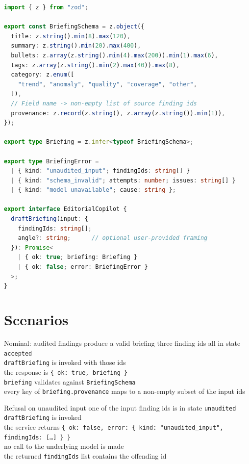 \begin{lstlisting}[language=TypeScript]
import { z } from "zod";

export const BriefingSchema = z.object({
  title: z.string().min(8).max(120),
  summary: z.string().min(20).max(400),
  bullets: z.array(z.string().min(4).max(200)).min(1).max(6),
  tags: z.array(z.string().min(2).max(40)).max(8),
  category: z.enum([
    "trend", "anomaly", "quality", "coverage", "other",
  ]),
  // Field name -> non-empty list of source finding ids
  provenance: z.record(z.string(), z.array(z.string()).min(1)),
});

export type Briefing = z.infer<typeof BriefingSchema>;

export type BriefingError =
  | { kind: "unaudited_input"; findingIds: string[] }
  | { kind: "schema_invalid"; attempts: number; issues: string[] }
  | { kind: "model_unavailable"; cause: string };

export interface EditorialCopilot {
  draftBriefing(input: {
    findingIds: string[];
    angle?: string;      // optional user-provided framing
  }): Promise<
    | { ok: true; briefing: Briefing }
    | { ok: false; error: BriefingError }
  >;
}
\end{lstlisting}

\section{Scenarios}

\begin{scenario}{Nominal: audited findings produce a valid briefing}
\Given three finding ids all in state \texttt{accepted} \\
\When \texttt{draftBriefing} is invoked with those ids \\
\Then the response is \texttt{\{ ok: true, briefing \}} \\
\And \texttt{briefing} validates against \texttt{BriefingSchema} \\
\And every key of \texttt{briefing.provenance} maps to a non-empty subset of the input ids
\end{scenario}

\begin{scenario}{Refusal on unaudited input}
\Given one of the input finding ids is in state \texttt{unaudited} \\
\When \texttt{draftBriefing} is invoked \\
\Then the service returns \texttt{\{ ok: false, error: \{ kind: "unaudited\_input", findingIds: [\ldots] \} \}} \\
\And no call to the underlying model is made \\
\And the returned \texttt{findingIds} list contains the offending id
\end{scenario}

